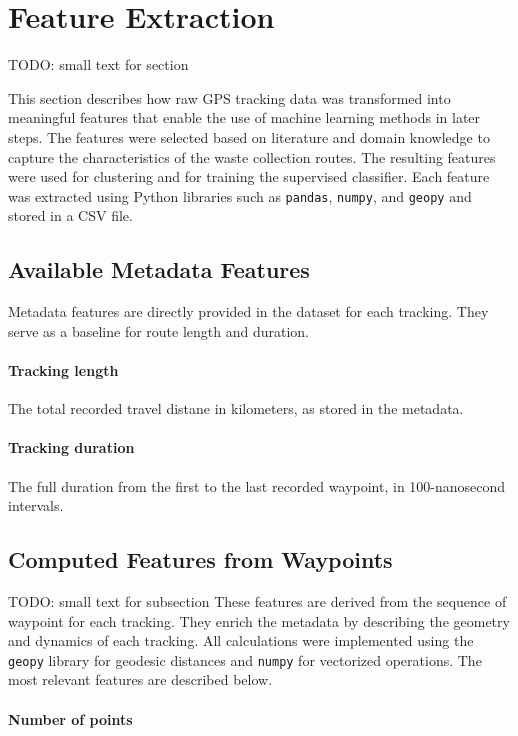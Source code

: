 \documentclass[a4paper,12pt,twoside]{scrreprt}
\begin{document}
\section{Feature Extraction}
TODO: small text for section

This section describes how raw GPS tracking data was transformed into
meaningful features that enable the use of machine learning methods in later
steps.
The features were selected based on literature and domain knowledge to capture
the characteristics of the waste collection routes.
The resulting features were used for clustering and for training the supervised
classifier. Each feature was extracted using Python libraries such as
\texttt{pandas}, \texttt{numpy}, and \texttt{geopy} and stored in a CSV file.

\subsection{Available Metadata Features}

Metadata features are directly provided in the dataset for each tracking. They
serve as a
baseline for route length and duration.

\paragraph{Tracking length}
The total recorded travel distane in kilometers, as stored in the metadata.

\paragraph{Tracking duration}
The full duration from the first to the last recorded waypoint, in
100-nanosecond intervals.

\subsection{Computed Features from Waypoints}
TODO: small text for subsection
These features are derived from the sequence of waypoint for each tracking.
They enrich the metadata by describing the geometry and dynamics of each
tracking.
All calculations were implemented using the \texttt{geopy} library for geodesic
distances and \texttt{numpy} for vectorized operations.
The most relevant features are described below.

\paragraph{Number of points}
\end{document}

